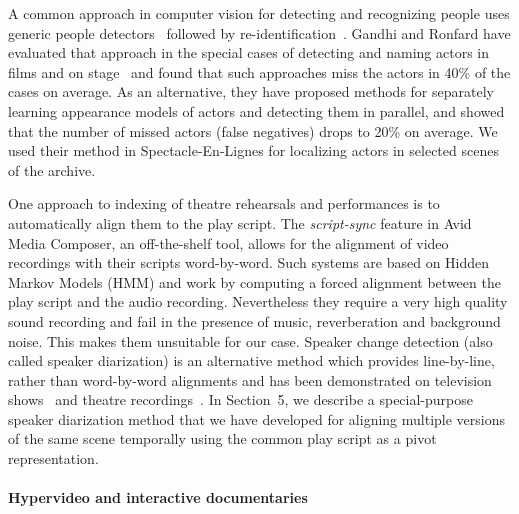 \documentclass[conference]{IEEEtran}
\begin{document}
A common approach in computer vision for detecting and recognizing people uses generic people detectors~\cite{Ronfard02,
Dalal05,Felzenszwalb10,Andriluka12} followed by re-identification~\cite{TapaswiBS12}. Gandhi and Ronfard have evaluated 
that approach in the special cases of detecting and naming actors in films and on stage~\cite{Gandhi13} and found that such 
approaches miss the actors in 40\% of the cases on average. As an alternative, they have proposed
methods for separately learning appearance models of actors and detecting them in parallel, and showed that the number
of missed actors (false negatives) drops to 20\% on average. We used their method in Spectacle-En-Lignes for localizing
actors in selected scenes of the archive.

One approach to indexing of theatre rehearsals and performances is to automatically align
them to the play script. The {\em script-sync} feature in Avid Media Composer,
an off-the-shelf tool, allows for the alignment of video recordings with their scripts word-by-word. Such systems
are based on Hidden Markov Models (HMM) and work by computing  a forced alignment 
between the play script and the audio recording. Nevertheless they require a very high quality 
sound recording and fail in the presence of music, reverberation and background noise. This makes them
unsuitable for our case. Speaker change detection (also called speaker diarization) is an alternative method
which provides line-by-line, rather than word-by-word alignments and has been demonstrated 
on television shows~\cite{Sankar09} and theatre recordings~\cite{Caillet07,Caillet13}. In Section~5,
we describe a special-purpose speaker diarization method that we have developed for aligning multiple versions 
of the same scene temporally using the common play script as a pivot representation.


\paragraph*{Hypervideo and interactive documentaries}
\end{document}
